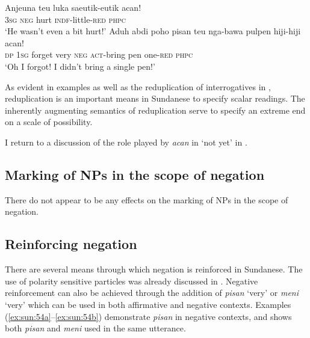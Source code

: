 \documentclass[output=paper]{langscibook}
\begin{document}
\ea\label{ex:sun:53}
    \ea\label{ex:sun:53a}
        \gll  Anjeuna teu luka saeutik-eutik acan! \\ 
              3\textsc{sg} \textsc{neg} hurt \textsc{indf}{}-little-\textsc{red} \textsc{phpc}\\
        \glt ‘He wasn’t even a bit hurt!’
    \ex\label{ex:sun:53b}
        \gll  Aduh abdi poho pisan teu nga-bawa pulpen hiji-hiji acan!\\
              \textsc{dp} 1\textsc{sg} forget very \textsc{neg} \textsc{act}{}-bring pen one-\textsc{red} \textsc{phpc}\\
        \glt ‘Oh I forgot! I didn’t bring a single pen!’ \citep[185]{Butters2021}
    \z
\z 

As evident in examples  as well as the reduplication of interrogatives in , reduplication is an important means in Sundanese to specify scalar readings. The inherently augmenting semantics of reduplication serve to specify an extreme end on a scale of possibility.

I return to a discussion of the role played by \textit{acan} in ‘{not yet}’ in .  


\subsection{Marking of NPs in the scope of negation}\label{sec:sun:4.3}


There do not appear to be any effects on the marking of NPs in the scope of negation. 


\subsection{Reinforcing negation}\label{sec:sun:4.4}


There are several means through which negation is reinforced in Sundanese. The use of polarity sensitive particles was already discussed in . Negative reinforcement can also be achieved through the addition of \textit{pisan} ‘very’ or \textit{meni} ‘very’ which can be used in both affirmative and negative contexts. Examples (\ref{ex:sun:54a}--\ref{ex:sun:54b}) demonstrate \textit{pisan} in negative contexts, and  shows both \textit{pisan} and \textit{meni} used in the same utterance. 
\end{document}
